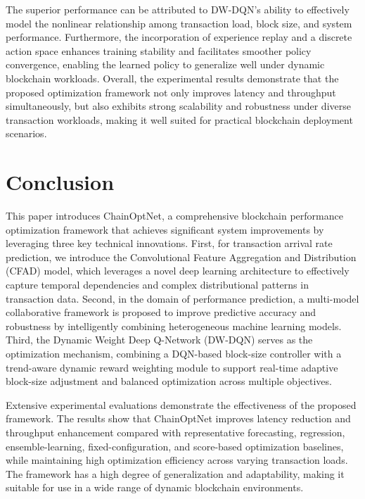\documentclass[a4paper,fleqn]{cas-dc}
\begin{document}
The superior performance can be attributed to DW-DQN's ability to effectively model the nonlinear relationship among transaction load, block size, and system performance. Furthermore, the incorporation of experience replay and a discrete action space enhances training stability and facilitates smoother policy convergence, enabling the learned policy to generalize well under dynamic blockchain workloads. Overall, the experimental results demonstrate that the proposed optimization framework not only improves latency and throughput simultaneously, but also exhibits strong scalability and robustness under diverse transaction workloads, making it well suited for practical blockchain deployment scenarios.



\section{Conclusion}\label{sec:conclusion}

This paper introduces ChainOptNet, a comprehensive blockchain performance optimization framework that achieves significant system improvements by leveraging three key technical innovations. First, for transaction arrival rate prediction, we introduce the Convolutional Feature Aggregation and Distribution (CFAD) model, which leverages a novel deep learning architecture to effectively capture temporal dependencies and complex distributional patterns in transaction data. Second, in the domain of performance prediction, a multi-model collaborative framework is proposed to improve predictive accuracy and robustness by intelligently combining heterogeneous machine learning models. Third, the Dynamic Weight Deep Q-Network (DW-DQN) serves as the optimization mechanism, combining a DQN-based block-size controller with a trend-aware dynamic reward weighting module to support real-time adaptive block-size adjustment and balanced optimization across multiple objectives.

Extensive experimental evaluations demonstrate the effectiveness of the proposed framework. The results show that ChainOptNet improves latency reduction and throughput enhancement compared with representative forecasting, regression, ensemble-learning, fixed-configuration, and score-based optimization baselines, while maintaining high optimization efficiency across varying transaction loads. The framework has a high degree of generalization and adaptability, making it suitable for use in a wide range of dynamic blockchain environments.
\end{document}
